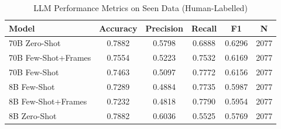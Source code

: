 \begin{table}[t]
\centering
\caption{LLM Performance Metrics on Seen Data (Human-Labelled)}
\label{tab:llm_performance_seen}
\begin{tabular}{lccccc}
\toprule
Model & Accuracy & Precision & Recall & F1 & N \\
\midrule
70B Zero-Shot & 0.7882 & 0.5798 & 0.6888 & 0.6296 & 2077 \\
70B Few-Shot+Frames & 0.7554 & 0.5223 & 0.7532 & 0.6169 & 2077 \\
70B Few-Shot & 0.7463 & 0.5097 & 0.7772 & 0.6156 & 2077 \\
8B Few-Shot & 0.7289 & 0.4884 & 0.7735 & 0.5987 & 2077 \\
8B Few-Shot+Frames & 0.7232 & 0.4818 & 0.7790 & 0.5954 & 2077 \\
8B Zero-Shot & 0.7882 & 0.6036 & 0.5525 & 0.5769 & 2077 \\
\bottomrule
\end{tabular}
\end{table}
